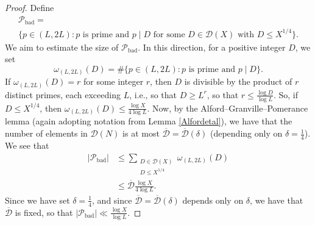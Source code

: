 \documentclass[12pt]{article}
\begin{document}
\begin{proof}
 Define 
\begin{multline*}
 \mathcal{P}_{\operatorname{bad}}
 = \\ \Big\{ p \in (L, 2L) : \text{$p$ is prime and $p \mid D$ for some $D \in \mathcal{D}(X)$ with $D \leq X^{1/4}$} \Big\}. 
\end{multline*}
 We aim to estimate the size of $\mathcal{P}_{\operatorname{bad}}$. In this direction, 
 for a positive integer $D$, we set 
 $$ \omega_{(L, 2L)}(D) = \#\big\{ p \in (L, 2L) : \text{$p$ is prime and $p \mid D$} \big\}. $$
 If $\omega_{(L, 2L)}(D) = r$ for some integer $r$, then $D$ is divisible by the product
 of $r$ distinct primes, each exceeding $L$, i.e., so that 
 $ D \geq L^{r}$, so that 
 $ r \leq \frac{\log D}{\log L}$. 
 So, if $D \leq X^{1/4}$, then 
 $ \omega_{(L, 2L)}(D) \leq \frac{\log X}{4 \log L}$. 
 Now, by the 
 Alford--Granville--Pomerance lemma 
 (again adopting notation from Lemma \ref{Alfordetal}), 
 we have that the number of elements in $\mathcal{D}(N)$ is at most $\overline{\mathcal{D}} = \overline{\mathcal{D}}(\delta)$
 (depending only on $\delta = \frac{1}{4}$). We see that 
\begin{align*}
 |\mathcal{P}_{\operatorname{bad}}|
 & \leq \sum_{\substack{ D \in \mathcal{D}(X) \\ D \leq X^{1/4} }} \omega_{(L, 2L)}(D) \\ 
 & \leq \overline{\mathcal{D}} \frac{\log X}{4 \log L}. 
\end{align*}
 Since we have set $\delta = \frac{1}{4}$, and since $\overline{\mathcal{D}} = \overline{\mathcal{D}}(\delta)$ depends only on $\delta$, 
 we have that 
 $\overline{\mathcal{D}}$ is fixed, so that $ \left| \mathcal{P}_{\operatorname{bad}} \right| \ll \frac{\log X}{\log L}$. 


\end{proof}
\end{document}
